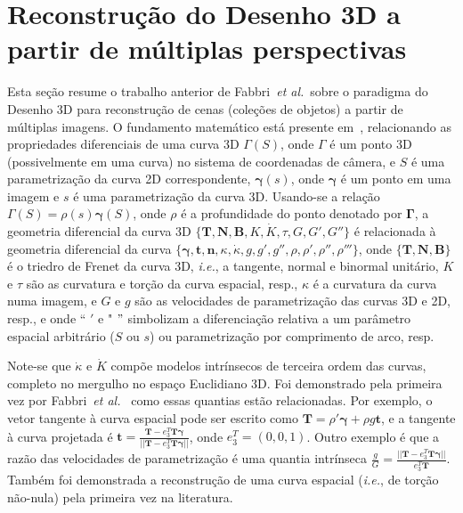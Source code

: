 \documentclass[a4paper,titlepage]{article}
\newcommand{\ie}{{\it i.e.}}
\newcommand{\etal}{{\it et al.}}
\newcommand{\Gama}{\boldsymbol{\Gamma}}
\newcommand{\gama}{\boldsymbol{\gamma}}
\begin{document}
\section{Reconstrução do Desenho 3D a partir de múltiplas perspectivas}
Esta seção resume o trabalho anterior de Fabbri~\etal\ sobre o paradigma do
Desenho 3D para reconstrução de cenas (coleções de objetos) a partir de múltiplas imagens.
O fundamento matemático está presente em~\cite{fabbri2016multiview},
relacionando as propriedades diferenciais de uma curva 3D
$\Gamma(S)$, onde $\Gamma$ é um ponto 3D (possivelmente em uma curva) no sistema
de coordenadas de câmera, e $S$ é uma parametrização da curva 2D
correspondente, $\gama(s)$, onde $\gama$ é um ponto em uma imagem e $s$ é uma
parametrização da curva 3D. Usando-se a relação
$\Gamma(S) = \rho(s) \gama(S)$, onde $\rho$ é a profundidade do ponto
denotado por $\Gama$, a geometria diferencial da curva 3D
$\{
\boldsymbol{T},\boldsymbol{N},\boldsymbol{B}, K, \dot{K},\tau, G,G',G''\}$ é
relacionada à geometria diferencial da curva 
$\{\boldsymbol{\gamma},
\boldsymbol{t}, \boldsymbol{n}, \kappa, \dot{\kappa}, g, g', g'',\rho,
\rho',\rho'',\rho'''\}$, onde
$\{\boldsymbol{T},\boldsymbol{N},\boldsymbol{B}\}$ é o triedro de Frenet da
curva 3D, \ie, a tangente, normal e binormal unitário, 
$K$ e $\tau$ são as curvatura e torção da curva espacial, resp.,
$\kappa$ é a curvatura da curva numa imagem, e $G$ e $g$ são as velocidades de
parametrização das curvas 3D e 2D, resp., e onde
`` $'$  e  "  $"$ simbolizam a diferenciação relativa a um parâmetro
espacial arbitrário ($S$ ou $s$) ou parametrização por comprimento de arco,
resp. 



Note-se que $\dot{\kappa}$ e $\dot{K}$ compõe modelos intrínsecos de terceira
ordem das curvas, completo no mergulho no espaço Euclidiano 3D.
Foi demonstrado pela primeira vez por Fabbri~\etal~\cite{fabbri2016multiview} como
essas quantias estão relacionadas. Por exemplo, o vetor tangente à curva
espacial pode ser escrito como 
$\boldsymbol{T}=\rho'\boldsymbol{\gamma}+\rho g \boldsymbol{t}$, e a tangente à
curva projetada é $\boldsymbol{t}=\frac{\boldsymbol{T}-e^T_3\boldsymbol{T}
\boldsymbol{\gamma}}{||\boldsymbol{T}-e^T_3\boldsymbol{T}
\boldsymbol{\gamma}||}$,  onde $e_3^T=(0,0,1)$. Outro exemplo é que a razão das
velocidades de parametrização é uma quantia intrínseca
$\frac{g}{G}=\frac{||\boldsymbol{T}-e^T_3\boldsymbol{T}
\boldsymbol{\gamma}||}{e^T_3\boldsymbol{T}}$. Também foi demonstrada a
reconstrução de uma curva espacial (\ie, de torção não-nula) pela primeira vez na literatura.
\end{document}
